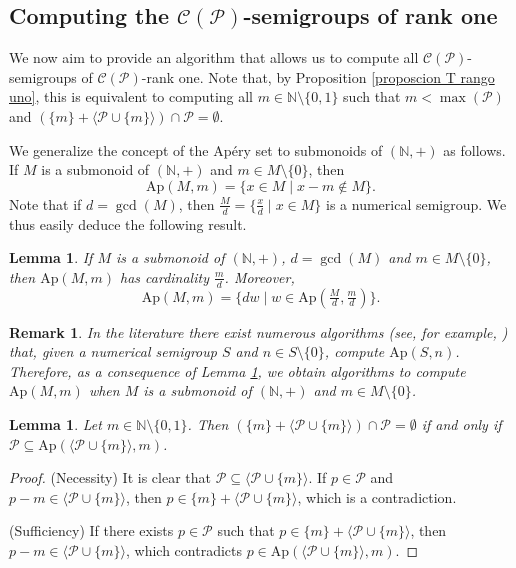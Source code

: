 \documentclass[11pt]{article}
\def\N{\mathbb{N}}
\newtheorem{lemma}[theorem]{Lemma}
\newtheorem{remark}[theorem]{Remark}
\numberwithin{equation}{section}
\newcommand{\CP}{\mathcal C(\mathcal P)}
\newcommand{\Ap}{\mathrm{Ap}}
\begin{document}
\subsection{\texorpdfstring{Computing the $\CP$-semigroups of rank one}{Computing the C(P)-semigroups of rank one}}\label{subsec:computing}

We now aim to provide an algorithm that allows us to compute all $\mathcal C(\mathcal P)$-semigroups of $\mathcal C(\mathcal P)$-rank one. Note that, by Proposition \ref{proposcion T rango uno}, this is equivalent to computing all $m\in\N\setminus\{0,1\}$ such that $m<\max(\mathcal P)$ and $(\{m\}+\langle\mathcal P\cup\{m\}\rangle)\cap\mathcal P=\emptyset$.

We generalize the concept of the Apéry set to submonoids of $(\N,+)$ as follows. If $M$ is a submonoid of $(\N,+)$ and $m\in M\setminus\{0\}$, then
\[
\mathrm{Ap}(M,m)=\{x\in M \mid x-m\notin M\}.
\]
Note that if $d=\gcd(M)$, then $\frac{M}{d}=\{\frac{x}{d}\mid x\in M\}$ is a numerical semigroup. We thus easily deduce the following result.

\begin{lemma}\label{lema cociente monoide y apery}
    If $M$ is a submonoid of $(\N,+)$, $d=\gcd(M)$ and $m\in M\setminus\{0\}$, then $\mathrm{Ap}(M,m)$ has cardinality $\frac{m}{d}$. Moreover,
    \[
    \mathrm{Ap}(M,m)=\{dw \mid w\in \mathrm{Ap}(\tfrac{M}{d},\tfrac{m}{d})\}.
    \]
\end{lemma}

\begin{remark}
    In the literature there exist numerous algorithms (see, for example, \cite{numericalsgps}) that, given a numerical semigroup $S$ and $n\in S\setminus\{0\}$, compute $\mathrm{Ap}(S,n)$. Therefore, as a consequence of Lemma \ref{lema cociente monoide y apery}, we obtain algorithms to compute $\mathrm{Ap}(M,m)$ when $M$ is a submonoid of $(\N,+)$ and $m\in M\setminus\{0\}$.
\end{remark}

\begin{lemma}\label{lema Apery vacio}
    Let $m\in\N\setminus\{0,1\}$. Then $(\{m\}+\langle\mathcal P\cup\{m\}\rangle)\cap \mathcal P=\emptyset$ if and only if $\mathcal P\subseteq \mathrm{Ap}(\langle\mathcal P\cup\{m\}\rangle,m)$.
\end{lemma}

\begin{proof}
    (Necessity) It is clear that $\mathcal P\subseteq\langle \mathcal P\cup\{m\}\rangle$. If $p\in\mathcal P$ and $p-m\in\langle\mathcal P\cup\{m\}\rangle$, then $p\in\{m\}+\langle \mathcal P\cup\{m\} \rangle$, which is a contradiction.

    (Sufficiency) If there exists $p\in\mathcal P$ such that $p\in\{m\}+\langle\mathcal P\cup\{m\}\rangle$, then $p-m\in\langle\mathcal P\cup\{m\}\rangle$, which contradicts $p\in\Ap(\langle\mathcal P\cup\{m\}\rangle,m)$.
\end{proof}
\end{document}
